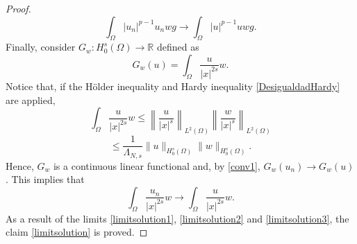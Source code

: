 \documentclass[10pt,a4paper]{amsart}
\begin{document}
\begin{proof}
\begin{equation}
				\int_{\Omega}|u_n|^{p-1}u_nwg\rightarrow  \int_{\Omega}|u|^{p-1}uwg.
			\end{equation}
			Finally, consider $G_w: H^s_0(\Omega)\rightarrow \mathbb{R}$ defined as
			\[G_w(u)=\int_{\Omega}\frac{u}{|x|^{2s}}w.\]
			Notice that, if the H\"older inequality and Hardy inequality \eqref{DesigualdadHardy} are applied,
			\[\int_{\Omega}\frac{u}{|x|^{2s}}w\leq \left\|\frac{u}{|x|^{s}}\right\|_{L^2(\Omega)} \left\|\frac{w}{|x|^{s}}\right\|_{L^2(\Omega)} \]\[\leq \frac{1}{\Lambda_{N,s}}\|u\|_{H^s_0(\Omega)}\|w\|_{H^s_0(\Omega)}.\]
			Hence, $G_w$ is a continuous linear functional and, by \ref{conv1}, ${G_w(u_n)\rightarrow G_w(u)}$. This implies that
			\begin{equation}\label{limitsolution3}
				\int_\Omega \frac{u_n}{|x|^{2s}}w\rightarrow \int_\Omega \frac{u}{|x|^{2s}}w.
			\end{equation}
			As a result of the limits \eqref{limitsolution1},  \eqref{limitsolution2} and  \eqref{limitsolution3}, the claim \eqref{limitsolution} is proved.
		\end{proof}
\end{document}
